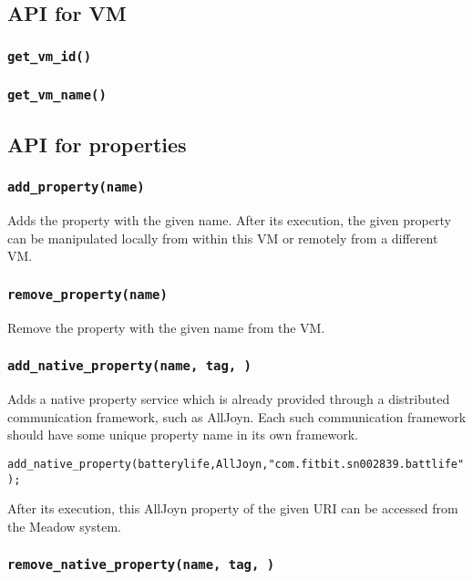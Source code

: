 \documentclass{note}
\begin{document}
\subsection{API for VM}
\subsubsection{\textcolor{red2}{\texttt{get\_vm\_id()}}}
\subsubsection{\textcolor{red2}{\texttt{get\_vm\_name()}}}

\subsection{API for properties}
\subsubsection{\textcolor{red2}{\texttt{add\_property(name)}}}
Adds the property with the given name. After its execution, the given property
can be manipulated locally from within this VM or remotely from a different VM.

\subsubsection{\textcolor{red2}{\texttt{remove\_property(name)}}}
Remove the property with the given name from the VM.

\subsubsection{\textcolor{red2}{\texttt{add\_native\_property(name, tag, \textrm{})}}}
Adds a native property service which is already provided through a distributed
communication framework, such as AllJoyn. Each such communication framework
should have some unique property name in its own framework. 
\begin{alltt}
  \textcolor{blue2}{add_native_property(batterylife, AllJoyn, "com.fitbit.sn002839.battlife");}
\end{alltt}
After its execution, this AllJoyn property of the given URI can be accessed
from the Meadow system.

\subsubsection{\textcolor{red2}{\texttt{remove\_native\_property(name, tag, \textrm{})}}}
\end{document}
